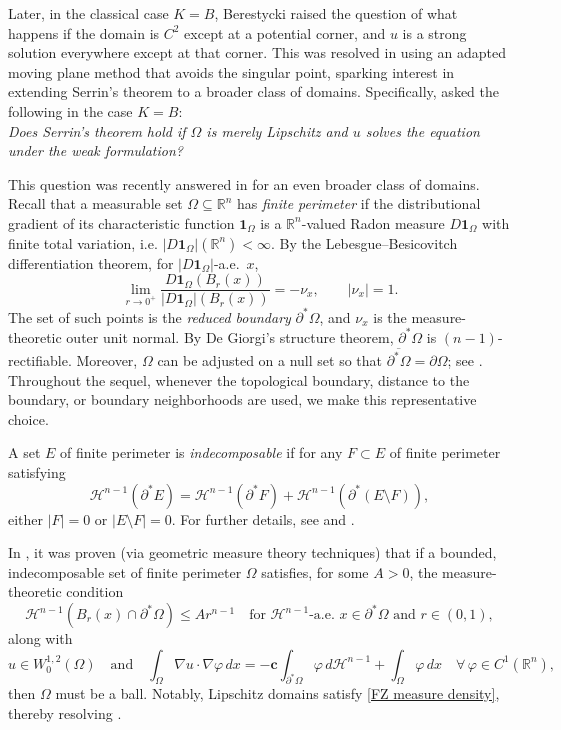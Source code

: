 \documentclass[reqno,11pt]{amsart}
\numberwithin{equation}{section}
\theoremstyle{remark}
\begin{document}
Later, in the classical case $K=B$, Berestycki raised the question of what happens if the domain is $C^2$ except at a potential corner, and $u$ is a strong
solution everywhere except at that corner. This was resolved in \cite{P1998} using an adapted moving plane
method that avoids the singular point, sparking interest in extending Serrin's theorem to a broader class of domains. Specifically,
\cite[Question 7.1]{HLL2024} asked the following in the case $K=B$:\\
\emph{Does Serrin's theorem hold if $\Omega$ is merely Lipschitz and $u$ solves the equation under the weak formulation?}

This question was recently answered in \cite{FZ2025} for an even broader class of domains. Recall that a measurable set
$\Omega\subseteq \mathbb R^n$ has \emph{finite perimeter} if the distributional gradient of its characteristic function
$\mathbf{1}_\Omega$ is a $\mathbb R^n$-valued Radon measure $D\mathbf{1}_\Omega$ with finite total variation, i.e.
$|D\mathbf{1}_\Omega|(\mathbb R^n)<\infty$.
By the Lebesgue--Besicovitch differentiation theorem, for $|D\mathbf{1}_{\Omega}|$-a.e.\ $x$,
\[
\lim_{r\to 0^+}\frac{D\mathbf{1}_\Omega(B_r(x))}{|D\mathbf{1}_\Omega|(B_r(x))} = -\nu_x,
\qquad |\nu_x| = 1.
\]
The set of such points is the \emph{reduced boundary} $\partial^*\Omega$, and $\nu_x$ is the measure-theoretic outer unit normal.
By De Giorgi's structure theorem, $\partial^*\Omega$ is  $(n-1)$-rectifiable. Moreover, $\Omega$ can be adjusted on a null
set so that $\overline{\partial^*\Omega}=\partial\Omega${; see \cite[Proposition 12.19]{M2012}. Throughout the sequel, whenever the topological
boundary, distance to the boundary, or boundary neighborhoods are used, we make this representative choice.}

A set $E$ of finite perimeter is \emph{indecomposable} if for any $F \subset E$ of finite perimeter satisfying
\[
\mathscr H^{n-1}(\partial^* E) = \mathscr H^{n-1}(\partial^* F) + \mathscr H^{n-1}(\partial^* (E\setminus F)),
\]
either $|F|=0$ or $|E\setminus F|=0$. For further details, see \cite{ACMM2001} and \cite[Sections 12 \& 15]{M2012}.

In \cite{FZ2025}, it was proven (via geometric measure theory techniques) that if a bounded, indecomposable set of finite
perimeter $\Omega$ satisfies, for some $A>0$, the measure-theoretic condition
\begin{equation}\label{FZ measure density}
\mathscr H^{n-1}(B_r(x)\cap \partial^* \Omega)\le A r^{n-1}
\quad \text{for $\mathscr H^{n-1}$-a.e.\ } x\in \partial^* \Omega \text{ and } r \in (0,1),
\end{equation}
along with
\begin{equation}\label{weak}
u \in W^{1,2}_0(\Omega)\quad\text{and}\quad
\int_{\Omega} \nabla u\cdot \nabla\varphi \, dx
= -\mathbf{c}\int_{\partial^* \Omega} \varphi \, d\mathscr{H}^{n-1} + \int_{\Omega} \varphi \, dx
\quad \forall\, \varphi\in C^1(\mathbb{R}^n),
\end{equation}
then $\Omega$ must be a ball. Notably, Lipschitz domains satisfy \eqref{FZ measure density}, thereby resolving
\cite[Question 7.1]{HLL2024}. 
\end{document}
